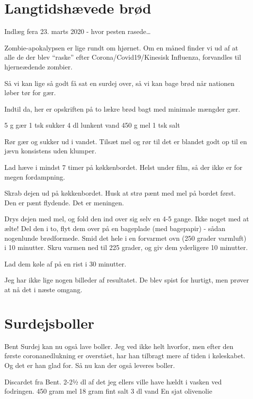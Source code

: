 \documentclass[
  letterpaper,
  DIV=11,
  numbers=noendperiod]{scrreprt}
\begin{document}
\hypertarget{langtidshuxe6vede-bruxf8d-1}{%
\section{Langtidshævede brød}\label{langtidshuxe6vede-bruxf8d-1}}

Indlæg fera 23. marts 2020 - hvor pesten rasede\ldots{}

Zombie-apokalypsen er lige rundt om hjørnet. Om en måned finder vi ud af
at alle de der blev ``raske'' efter Corona/Covid19/Kinesisk Influenza,
forvandles til hjerneædende zombier.

Så vi kan lige så godt få sat en surdej over, så vi kan bage brød når
nationen løber tør for gær.

Indtil da, her er opskriften på to lækre brød bagt med minimale mængder
gær.

5 g gær 1 tsk sukker 4 dl lunkent vand 450 g mel 1 tsk salt

Rør gær og sukker ud i vandet. Tilsæt mel og rør til det er blandet godt
op til en jævn konsistens uden klumper.

Lad hæve i mindst 7 timer på køkkenbordet. Helst under film, så der ikke
er for megen fordampning.

Skrab dejen ud på køkkenbordet. Husk at strø pænt med mel på bordet
først. Den er pænt flydende. Det er meningen.

Drys dejen med mel, og fold den ind over sig selv en 4-5 gange. Ikke
noget med at ælte! Del den i to, flyt dem over på en bageplade (med
bagepapir) - sådan nogenlunde brødformede. Smid det hele i en forvarmet
ovn (250 grader varmluft) i 10 minutter. Skru varmen ned til 225 grader,
og giv dem yderligere 10 minutter.

Lad dem køle af på en rist i 30 minutter.

Jeg har ikke lige nogen billeder af resultatet. De blev spist for
hurtigt, men prøver at nå det i næste omgang.

\hypertarget{surdejsboller-1}{%
\section{Surdejsboller}\label{surdejsboller-1}}

Bent Surdej kan nu også lave boller. Jeg ved ikke helt hvorfor, men
efter den første coronanedlukning er overstået, har han tilbragt mere af
tiden i køleskabet. Og det er han glad for. Så nu kan der også leveres
boller.

Discardet fra Bent. 2-2½ dl af det jeg ellers ville have hældt i vasken
ved fodringen. 450 gram mel 18 gram fint salt 3 dl vand En sjat
olivenolie
\end{document}
